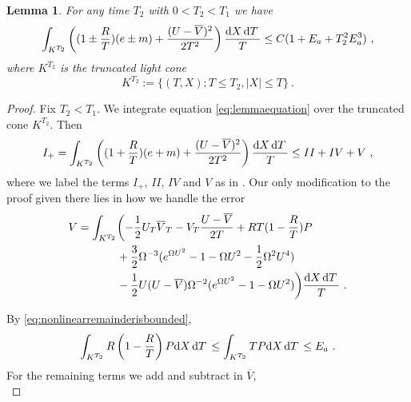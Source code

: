 \documentclass[a4paper]{amsart}
\newtheorem{lemma}[thm]{Lemma}
\providecommand{\abs}[1]{\lvert #1 \rvert}
\providecommand{\dint}[1]{ {\rm d} #1\,}
\begin{document}
\begin{lemma}
  For any time $T_2$ with $0 < T_2 < T_1$ we have
  \begin{equation*}
    \int_{K^{T_2}}
    \left(
    (1 \pm \frac{R}{T})(e \pm m)
    +
    \frac{(U - \overline{V})^2}{2 T^2}
    \right)
    \frac{\dint{X} \dint{T}}{T}
    \leq
    C (1 + E_a + T_2^2 E_a^3) \ ,
  \end{equation*}
  where $K^{T_2}$ is the truncated light cone
  \begin{equation*}
    K^{T_2}
    :=
    \{
    (T, X);
    T \leq T_2,
    \abs{X} \leq T
    \}
    \ .
  \end{equation*}
  \label{lem:boundedenergyintimeslices}
\end{lemma}
\begin{proof}
  Fix $T_2 < T_1$. We integrate equation \eqref{eq:lemmaequation} over
  the truncated cone $K^{T_2}$. Then
  \begin{equation*}
      I_{+}
      =
      \int_{K^{T_2}}
      \left(
      (1 + \frac{R}{T})(e + m)
      +
      \frac{(U - \overline{V})^2}{2 T^2}
      \right)
      \frac{\dint{X} \dint{T}}{T}
      \leq
      II + IV + V \ ,
  \end{equation*}
  where we label the terms $I_{+}$, $II$, $IV$ and $V$ as in
  \cite[pp6-9]{Struwe10}. Our only modification to the proof given there
  lies in how we handle the error
  \begin{equation*}
    \begin{split}
      V
      =
      \int_{K^{T_2}}
      &\biggl(
      -\frac{1}{2} U_T \overline{V}_T
      -
      V_T \frac{U- \overline{V}}{2 T}
      +
      R T (1 - \frac{R}{T}) P \\
      &+
      \frac{3}{2} \Omega^{-3}
      (e^{\Omega U^2} - 1 - \Omega U^2 - \frac{1}{2} \Omega^2 U^4)
      \\
      &-
      \frac{1}{2} U (U - \overline{V}) \Omega^{-2}
      (e^{\Omega U^2} - 1 - \Omega U^2) \biggr)
      \frac{\dint{X} \dint{T}}{T} \ .
    \end{split}
  \end{equation*}
  \par
  By \eqref{eq:nonlinearremainderisbounded},
  \begin{equation*}
    \int_{K^{T_2}}
    R \left(1 - \frac{R}{T}\right) P \dint{X} \dint{T}
    \leq
    \int_{K^{T_2}}
    T P \dint{X} \dint{T}
    \leq
    E_a \ .
  \end{equation*}
  For the remaining terms we add and subtract in $\overline{V}$,
  \begin{equation*}

\end{equation*}
\end{proof}
\end{document}
